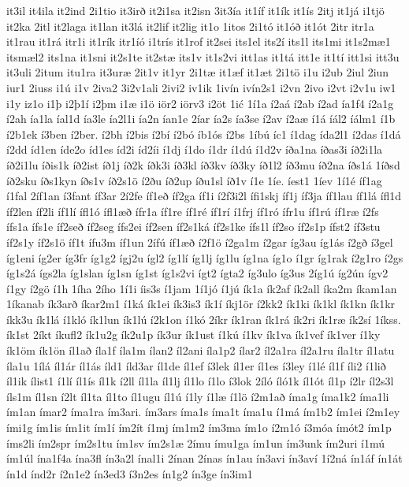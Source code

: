 {it3il
it4ila
it2ind
2i1tio
it3irð
it2i1sa
it2isn
3it3ía
it1íf
it1ík
it1ís
2itj
it1já
i1tjö
it2ka
2itl
it2laga
it1lan
it3lá
it2lif
it2lig
it1o
1itos
2i1tó
it1óð
it1ót
2itr
itr1a
it1rau
it1rá
itr1i
it1rík
itr1íó
i1trís
it1rof
it2sei
its1el
its2í
its1l
its1mi
it1s2mæ1
itsmæl2
its1na
it1sni
it2s1te
it2stæ
its1v
it1s2vi
itt1as
it1tá
itt1e
it1tí
itt1si
itt3u
it3uli
2itum
itu1ra
it3uræ
2it1v
it1yr
2i1tæ
it1æf
it1æt
2i1tö
i1u
i2ub
2iul
2iun
iur1
2iuss
i1ú
i1v
2iva2
3i2v1ali
2ivi2
iv1ik
1ivín
ivín2s1
i2vn
2ivo
i2vt
i2v1u
iw1
i1y
iz1o
i1þ
i2þ1í
i2þm
i1æ
i1ö
iör2
iörv3
i2öt
1ić
1í1a
í2aá
í2ab
í2ad
ía1f4
í2a1g
í2ah
ía1la
íal1d
ía3le
ía2l1i
ía2n
ían1e
2íar
ía2s
ía3se
í2av
í2aæ
í1á
íál2
íálm1
í1b
í2b1ek
í3ben
í2ber.
í2bh
í2bis
í2bí
í2bó
íb1ós
í2bs
1íbú
íc1
í1dag
ída2l1
í2das
í1dá
í2dd
íd1en
íde2o
íd1es
íd2i
íd2íi
í1dj
í1do
í1dr
í1dú
í1d2v
íða1na
íðas3i
íð2i1la
íð2i1lu
íðis1k
íð2ist
íð1j
íð2k
íðk3i
íð3kl
íð3kv
íð3ky
íð1l2
íð3mu
íð2na
íðs1á
1íðsd
íð2sku
íðs1kyn
íðs1v
íð2s1ö
í2ðu
íð2up
íðu1sl
íð1v
í1e
1íe.
íest1
1íev
1í1é
íf1ag
í1fal
2íf1an
í3fant
íf3ar
2í2fe
íf1eð
íf2ga
íf1i
í2f3i2l
ífi1skj
íf1j
íf3ja
íf1lau
íf1lá
ífl1d
íf2len
íf2li
íf1lí
ífl1ó
ífl1æð
ífr1a
íf1re
íf1ré
íf1rí
í1frj
íf1ró
ífr1u
íf1rú
íf1ræ
í2fs
ífs1a
ífs1e
íf2seð
íf2seg
ífs2ei
íf2sen
íf2s1ká
íf2s1ke
ífs1l
íf2so
íf2s1p
ífst2
íf3stu
íf2s1y
íf2s1ö
íf1t
ífu3m
íf1un
2ífú
íf1æð
í2f1ö
í2ga1m
í2gar
íg3au
íg1ás
í2gð
í3gel
íg1eni
íg2er
íg3fr
íg1g2
ígj2u
ígl2
íg1lí
íg1lj
íg1lu
íg1na
íg1o
í1gr
íg1rak
í2g1ro
í2gs
íg1s2á
ígs2la
íg1slan
íg1sn
íg1st
íg1s2vi
ígt2
ígta2
íg3ulo
íg3us
2íg1ú
íg2ún
ígv2
í1gy
í2gö
í1h
1íha
2ího
1í1i
íis3s
í1jam
1í1jó
í1jú
ík1a
ík2af
ík2all
íka2m
íkam1an
1íkanab
ík3arð
íkar2m1
í1ká
ík1ei
ík3is3
ík1í
íkj1ör
í2kk2
ík1ki
ík1kl
ík1kn
ík1kr
íkk3u
ík1lá
í1kló
ík1lun
ík1lú
í2k1on
í1kó
2íkr
ík1ran
ík1rá
ík2ri
ík1ræ
ík2sí
1íkss.
ík1st
2íkt
íkufl2
ík1u2g
ík2u1p
ík3ur
ík1ust
í1kú
í1kv
ík1va
ík1vef
ík1ver
í1ky
ík1öm
ík1ön
íl1að
íla1f
íla1m
ílan2
íl2ani
íla1p2
ílar2
íl2a1ra
íl2a1ru
íla1tr
íl1atu
íla1u
1ílá
íl1ár
íl1ás
íld1
íld3ar
íl1de
íl1ef
í3lek
íl1er
íl1es
í3ley
í1lé
íl1f
íli2
í1lið
íl1ik
ílist1
í1lí
íl1ís
íl1k
í2ll
íl1la
íl1lj
íl1lo
í1lo
í3lok
2íló
íló1k
íl1ót
íl1p
í2lr
íl2s3l
íls1m
íl1sn
í2lt
íl1ta
íl1to
íl1ugu
íl1ú
í1ly
í1læ
í1lö
í2m1að
íma1g
íma1k2
íma1li
ím1an
ímar2
íma1ra
ím3ari.
ím3ars
íma1s
íma1t
íma1u
í1má
ím1b2
ím1ei
í2m1ey
ími1g
ím1is
ím1it
ím1í
ím2ít
í1mj
ím1m2
ím3ma
ím1o
í2m1ó
í3móa
ímót2
ím1p
íms2li
ím2spr
ím2s1tu
ím1sv
ím2s1æ
2ímu
ímu1ga
ím1un
ím3unk
ím2uri
í1mú
ím1úl
ína1f4a
ína3fl
ín3a2l
ínal1i
2ínan
2ínas
ín1au
ín3avi
ín3aví
1í2ná
ín1áf
ín1át
ín1d
índ2r
í2n1e2
ín3ed3
í3n2es
ín1g2
ín3ge
ín3im1
}
